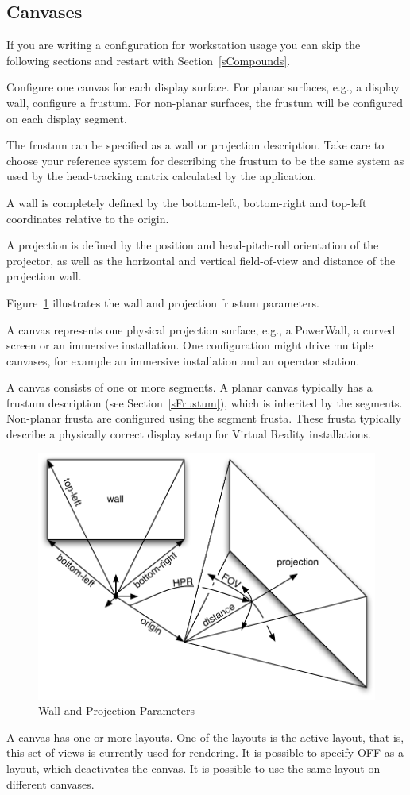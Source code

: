 \documentclass[10pt,a4]{scrartcl}
\newcommand{\fig}[1]{Figure~\ref{#1}}
\newcommand{\sref}[1]{Section~\ref{#1}}
\begin{document}
\subsection{\label{sCanvas}Canvases}

If you are writing a configuration for workstation usage you can skip
the following sections and restart with \sref{sCompounds}.

Configure one \textsf{canvas} for each display surface. For planar
surfaces, e.g., a display wall, configure a frustum. For non-planar
surfaces, the frustum will be configured on each display segment.

The frustum can be specified as a wall or projection description. Take
care to choose your reference system for describing the frustum to be
the same system as used by the head-tracking matrix calculated by the
application.

A wall is completely defined by the bottom-left, bottom-right and
top-left coordinates relative to the origin.

A projection is defined by the position and head-pitch-roll orientation
of the projector, as well as the horizontal and vertical field-of-view
and distance of the projection wall.

\fig{fFrusta} illustrates the wall and projection frustum parameters.

A canvas represents one physical projection surface, e.g., a PowerWall, a
curved screen or an immersive installation. One configuration might
drive multiple canvases, for example an immersive installation and an
operator station.

A canvas consists of one or more segments. A planar canvas typically has
a frustum description (see \sref{sFrustum}), which is inherited by the
segments. Non-planar frusta are configured using the segment
frusta. These frusta typically describe a physically correct display
setup for Virtual Reality installations.

\begin{figure}
  \includegraphics[width=.618\textwidth]{images/frusta.pdf}
  {\caption{\label{fFrusta}Wall and Projection Parameters}}
\end{figure}
A canvas has one or more layouts. One of the layouts is the active
layout, that is, this set of views is currently used for rendering. It
is possible to specify \textsf{OFF} as a layout, which deactivates the
canvas. It is possible to use the same layout on different canvases.
\end{document}
